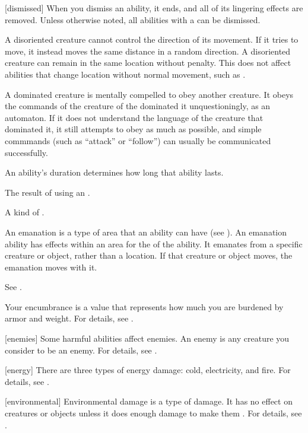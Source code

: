 [dismissed] When you dismiss an ability, it ends, and all of its lingering effects are removed.
Unless otherwise noted, all abilities with a  can be dismissed.

 A disoriented creature cannot control the direction of its movement.
If it tries to move, it instead moves the same distance in a random direction.
A disoriented creature can remain in the same location without penalty.
This does not affect abilities that change location without normal movement, such as .

 A dominated creature is mentally compelled to obey another creature.
It obeys the commands of the creature of the dominated it unquestioningly, as an automaton.
If it does not understand the language of the creature that dominated it, it still attempts to obey as much as possible, and simple commmands (such as ``attack'' or ``follow'') can usually be communicated successfully.

 An ability's duration determines how long that ability lasts.

 The result of using an .

 A kind of .

 An emanation is a type of area that an ability can have (see ).
An emanation ability has effects within an area for the  of the ability.
It emanates from a specific creature or object, rather than a location.
If that creature or object moves, the emanation moves with it.

 See .

 Your encumbrance is a value that represents how much you are burdened by armor and weight.
For details, see .

[enemies] Some harmful abilities affect enemies.
An enemy is any creature you consider to be an enemy.
For details, see .

[energy] There are three types of energy damage: cold, electricity, and fire.
For details, see .

[environmental] Environmental damage is a type of damage.
It has no effect on creatures or objects unless it does enough damage to make them .
For details, see .

